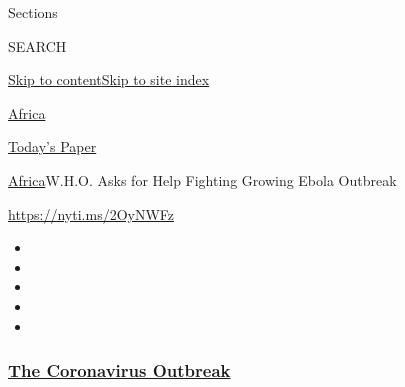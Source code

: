 Sections

SEARCH

\protect\hyperlink{site-content}{Skip to
content}\protect\hyperlink{site-index}{Skip to site index}

\href{https://www.nytimes3xbfgragh.onion/section/world/africa}{Africa}

\href{https://myaccount.nytimes3xbfgragh.onion/auth/login?response_type=cookie\&client_id=vi}{}

\href{https://www.nytimes3xbfgragh.onion/section/todayspaper}{Today's
Paper}

\href{/section/world/africa}{Africa}\textbar{}W.H.O. Asks for Help
Fighting Growing Ebola Outbreak

\url{https://nyti.ms/2OyNWFz}

\begin{itemize}
\item
\item
\item
\item
\item
\end{itemize}

\hypertarget{the-coronavirus-outbreak}{%
\subsubsection{\texorpdfstring{\href{https://www.nytimes3xbfgragh.onion/news-event/coronavirus?name=styln-coronavirus-national\&region=TOP_BANNER\&block=storyline_menu_recirc\&action=click\&pgtype=Article\&impression_id=b95ca800-f1ea-11ea-a70e-33eec3aac5bb\&variant=undefined}{The
Coronavirus
Outbreak}}{The Coronavirus Outbreak}}\label{the-coronavirus-outbreak}}


